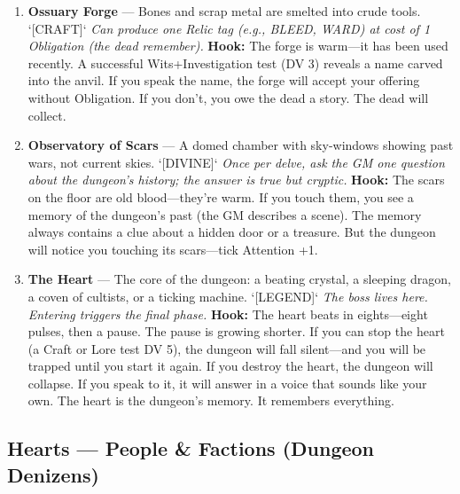 \begin{enumerate}
\item[Q] \textbf{Ossuary Forge} --- Bones and scrap metal are smelted into crude tools. `[CRAFT]`
  \hfill \textit{Can produce one Relic tag (e.g., BLEED, WARD) at cost of 1 Obligation (the dead remember).}
  \textbf{Hook:} The forge is warm---it has been used recently. A successful Wits+Investigation test (DV 3) reveals a name carved into the anvil. If you speak the name, the forge will accept your offering without Obligation. If you don't, you owe the dead a story. The dead will collect.

\item[K] \textbf{Observatory of Scars} --- A domed chamber with sky-windows showing past wars, not current skies. `[DIVINE]`
  \hfill \textit{Once per delve, ask the GM one question about the dungeon's history; the answer is true but cryptic.}
  \textbf{Hook:} The scars on the floor are old blood---they're warm. If you touch them, you see a memory of the dungeon's past (the GM describes a scene). The memory always contains a clue about a hidden door or a treasure. But the dungeon will notice you touching its scars---tick Attention +1.

\item[A] \textbf{The Heart} --- The core of the dungeon: a beating crystal, a sleeping dragon, a coven of cultists, or a ticking machine. `[LEGEND]`
  \hfill \textit{The boss lives here. Entering triggers the final phase.}
  \textbf{Hook:} The heart beats in eights---eight pulses, then a pause. The pause is growing shorter. If you can stop the heart (a Craft or Lore test DV 5), the dungeon will fall silent---and you will be trapped until you start it again. If you destroy the heart, the dungeon will collapse. If you speak to it, it will answer in a voice that sounds like your own. The heart is the dungeon's memory. It remembers everything.
\end{enumerate}

\subsection*{Hearts --- People \& Factions (Dungeon Denizens)}

